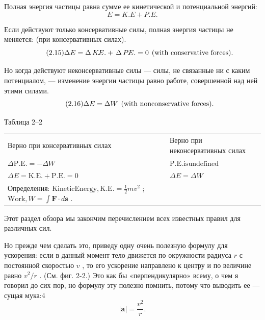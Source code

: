 \documentclass[11pt,oneside]{article}
\providecommand{\FLPF}{\mathbf{F}}
\providecommand{\FLPa}{\mathbf{a}}
\providecommand{\FLPs}{\mathbf{s}}
\begin{document}
Полная энергия частицы равна сумме ее кинетической и потенциальной энергий: 
\begin{equation*} \tag{2.14}
\label{Eq:TIPS:2:14} E = K\!.\!E+P\!.\!E. \end{equation*}
\par

Если действуют только консервативные силы, полная энергия частицы не меняется: (при консервативных силах). 
\begin{equation*} \tag{2.15}
\label{Eq:TIPS:2:15} \Delta E = \Delta\,K\!.\!E.+\,\Delta\,P\!.\!E.=0\hskip1ex(\text{with }\mathrm{conservative}\text{ forces}). \end{equation*}
\par

Но когда действуют неконсервативные силы --- силы, не связанные ни с каким потенциалом, --- изменение энергии частицы равно работе, совершенной над ней этими силами. 
\begin{equation*} \tag{2.16}
\label{Eq:TIPS:2:16} \Delta E = \Delta W\hskip1ex(\text{with }\mathrm{nonconservative}\text{ forces}). \end{equation*}
\par

\begin{center}
{\small Таблица 2--2}\par\smallskip
\begin{tabular}{ll}
Верно при консервативных силах & Верно при неконсервативных силах\\
\(\Delta\mathrm{P.E.} = -\Delta W\) & \(\mathrm{P.E. is undefined}\)\\
\(\Delta E = \mathrm{K.E.} + \mathrm{P.E.} = 0\) & \(\Delta E = \Delta W\)\\
Определения: \(\mathrm{Kinetic Energy, K.E.}=\frac12mv^2\) ; \(\mathrm{Work, } W=\int \FLPF\cdot d\FLPs\) . & {}
\end{tabular}
\end{center}

Этот раздел обзора мы закончим перечислением всех известных правил для различных сил.\par

Но прежде чем сделать это, приведу одну очень полезную формулу для ускорения: если в данный момент тело движется по окружности радиуса \(r\) с постоянной скоростью \(v\) , то его ускорение направлено к центру и по величине равно \(v^2/r\) . (См. фиг. 2-2.) Это как бы «перпендикулярно» всему, о чем я говорил до сих пор, но формулу эту полезно помнить, потому что выводить ее --- сущая мука:4 
\begin{equation*} \tag{2.17}
\label{Eq:TIPS:2:17} |\FLPa| = \frac{v^2}r. \end{equation*}
\par
\end{document}
